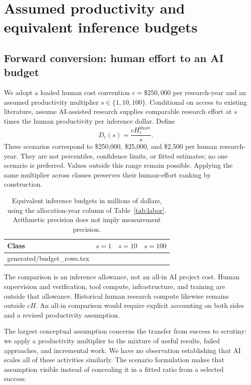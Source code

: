 \documentclass[11pt,letterpaper]{article}
\makeatletter
\let\inputrows\@@input
\makeatother
\begin{document}
\section{Assumed productivity and equivalent inference budgets}
\subsection{Forward conversion: human effort to an AI budget}
We adopt a loaded human cost convention $c=\$250{,}000$ per research-year and an assumed productivity multiplier $s\in\{1,10,100\}$. Conditional on access to existing literature, assume AI-assisted research supplies comparable research effort at $s$ times the human productivity per inference dollar. Define
\begin{equation}
 D_c(s)=\frac{cH^{\mathrm{share}}_c}{s}.
 \label{eq:forward}
\end{equation}
These scenarios correspond to \$250,000, \$25,000, and \$2,500 per human research-year. They are not percentiles, confidence limits, or fitted estimates; no one scenario is preferred. Values outside this range remain possible. Applying the same multiplier across classes preserves their human-effort ranking by construction.

\begin{table}[htbp]
\centering\small
\caption{Equivalent inference budgets in millions of dollars, using the allocation-year column of Table~\ref{tab:labor}. Arithmetic precision does not imply measurement precision.}
\label{tab:budgets}
\begin{tabular}{lrrr}\toprule
Class & $s=1$ & $s=10$ & $s=100$\\\midrule
\inputrows generated/budget_rows.tex
\bottomrule\end{tabular}
\end{table}

The comparison is an inference allowance, not an all-in AI project cost. Human supervision and verification, tool compute, infrastructure, and training are outside that allowance. Historical human research compute likewise remains outside $cH$. An all-in comparison would require explicit accounting on both sides and a revised productivity assumption.

The largest conceptual assumption concerns the transfer from success to scrutiny: we apply a productivity multiplier to the mixture of useful results, failed approaches, and incremental work. We have no observation establishing that AI scales all of these activities similarly. The scenario formulation makes that assumption visible instead of concealing it in a fitted ratio from a selected success.
\end{document}
